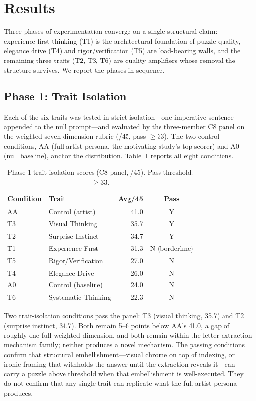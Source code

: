 \section{Results}
\label{sec:results}

Three phases of experimentation converge on a single structural claim: experience-first thinking (T1) is the architectural foundation of puzzle quality, elegance drive (T4) and rigor/verification (T5) are load-bearing walls, and the remaining three traits (T2, T3, T6) are quality amplifiers whose removal the structure survives. We report the phases in sequence.

\subsection{Phase 1: Trait Isolation}

Each of the six traits was tested in strict isolation---one imperative sentence appended to the null prompt---and evaluated by the three-member C8 panel on the weighted seven-dimension rubric (/45, pass $\geq 33$). The two control conditions, AA (full artist persona, the motivating study's top scorer) and A0 (null baseline), anchor the distribution. Table~\ref{tab:phase1} reports all eight conditions.

\begin{table}[h]
\centering
\caption{Phase 1 trait isolation scores (C8 panel, /45). Pass threshold: $\geq 33$.}
\label{tab:phase1}
\begin{tabular}{llrc}
\hline
\textbf{Condition} & \textbf{Trait} & \textbf{Avg/45} & \textbf{Pass} \\
\hline
AA  & Control (artist) & 41.0 & Y \\
T3  & Visual Thinking & 35.7 & Y \\
T2  & Surprise Instinct & 34.7 & Y \\
T1  & Experience-First & 31.3 & N (borderline) \\
T5  & Rigor/Verification & 27.0 & N \\
T4  & Elegance Drive & 26.0 & N \\
A0  & Control (baseline) & 24.0 & N \\
T6  & Systematic Thinking & 22.3 & N \\
\hline
\end{tabular}
\end{table}

Two trait-isolation conditions pass the panel: T3 (visual thinking, 35.7) and T2 (surprise instinct, 34.7). Both remain 5--6 points below AA's 41.0, a gap of roughly one full weighted dimension, and both remain within the letter-extraction mechanism family; neither produces a novel mechanism. The passing conditions confirm that structural embellishment---visual chrome on top of indexing, or ironic framing that withholds the answer until the extraction reveals it---can carry a puzzle above threshold when that embellishment is well-executed. They do not confirm that any single trait can replicate what the full artist persona produces.

